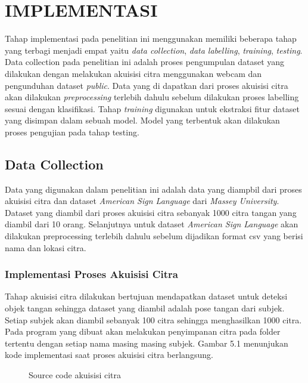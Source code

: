 \chapter{IMPLEMENTASI}
Tahap implementasi pada penelitian ini menggunakan memiliki beberapa tahap yang terbagi menjadi empat yaitu \textit{data collection}, \textit{data labelling}, \textit{training}, \textit{testing}.
Data collection pada penelitian ini adalah proses pengumpulan dataset yang dilakukan dengan melakukan akuisisi citra menggunakan webcam dan pengunduhan dataset \textit{public}. Data yang di dapatkan dari proses akuisisi citra akan dilakukan \textit{preprocessing} terlebih dahulu sebelum dilakukan proses labelling sesuai dengan klasifikasi. Tahap \textit{training} digunakan untuk ekstraksi fitur dataset yang disimpan dalam sebuah model. Model yang terbentuk akan dilakukan proses pengujian pada tahap testing.

\section{Data Collection}
Data yang digunakan dalam penelitian ini adalah data yang diampbil dari proses akuisisi citra dan dataset \textit{American Sign Language} dari \textit{Massey University}. Dataset yang diambil dari proses akuisisi citra sebanyak 1000 citra tangan yang diambil dari 10 orang. Selanjutnya untuk dataset \textit{American Sign Language} akan dilakukan preprocessing terlebih dahulu sebelum dijadikan format csv yang berisi nama dan lokasi citra.

\subsection{Implementasi Proses Akuisisi Citra}
Tahap akuisisi citra dilakukan bertujuan mendapatkan dataset untuk deteksi objek tangan sehingga dataset yang diambil adalah pose tangan dari subjek. Setiap subjek akan diambil sebanyak 100 citra sehingga menghasilkan 1000 citra. Pada program yang dibuat akan melakukan penyimpanan citra pada folder tertentu dengan setiap nama masing masing subjek. Gambar 5.1 menunjukan kode implementasi saat proses akuisisi citra berlangsung.
\begin{figure}[H]
	\centering
	
	\caption{Source code akuisisi citra}
\end{figure}

